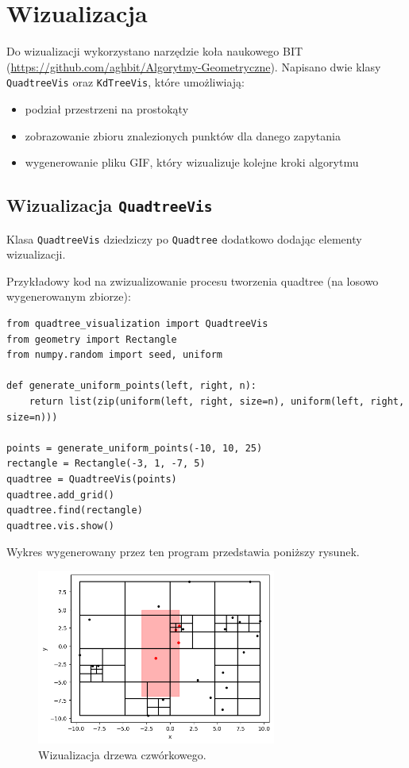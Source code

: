 \documentclass[12pt]{scrartcl}
\begin{document}
\section{Wizualizacja}
Do wizualizacji wykorzystano narzędzie koła naukowego BIT (\url{https://github.com/aghbit/Algorytmy-Geometryczne}). Napisano dwie klasy \texttt{QuadtreeVis} oraz \texttt{KdTreeVis}, które umożliwiają:
\begin{itemize}
    \item podział przestrzeni na prostokąty
    \item zobrazowanie zbioru znalezionych punktów dla danego zapytania
    \item wygenerowanie pliku GIF, który wizualizuje kolejne kroki algorytmu
\end{itemize}

\subsection{Wizualizacja \texttt{QuadtreeVis}}
Klasa \texttt{QuadtreeVis} dziedziczy po \texttt{Quadtree} dodatkowo dodając elementy wizualizacji.

Przykładowy kod na zwizualizowanie procesu tworzenia quadtree (na losowo wygenerowanym zbiorze):

\begin{verbatim}
from quadtree_visualization import QuadtreeVis
from geometry import Rectangle
from numpy.random import seed, uniform

def generate_uniform_points(left, right, n):
    return list(zip(uniform(left, right, size=n), uniform(left, right, size=n)))

points = generate_uniform_points(-10, 10, 25)
rectangle = Rectangle(-3, 1, -7, 5)
quadtree = QuadtreeVis(points)
quadtree.add_grid()
quadtree.find(rectangle)
quadtree.vis.show()
\end{verbatim}

Wykres wygenerowany przez ten program przedstawia poniższy rysunek.

\begin{figure}[H]
    \centering
    \includegraphics[width=0.7\textwidth]{imgs/quadtree_vis.png}
    \caption{Wizualizacja drzewa czwórkowego.}
\end{figure}
\end{document}

